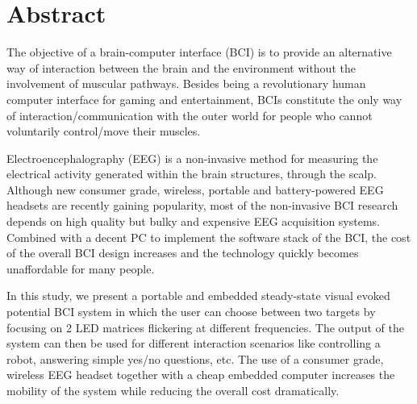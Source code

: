\documentclass[12pt]{article}
\numberwithin{equation}{section}
\numberwithin{figure}{section}
\numberwithin{table}{section}
\begin{document}
\renewcommand\listfigurename{\normalsize\bfseries List of Figures}
\thispagestyle{empty}
\vspace*{0.15cm}
\listoffigures
\clearpage

\renewcommand\listtablename{\normalsize\bfseries List of Tables}
\thispagestyle{empty}
\vspace*{0.15cm}
\listoftables
\clearpage

\vspace*{-0.35cm}
\thispagestyle{empty}
\section*{Abstract}
\vspace*{6pt}

\par{
    The objective of a brain-computer interface (BCI) is to provide an alternative way of interaction between the brain and the environment
    without the involvement of muscular pathways. Besides being a revolutionary human computer interface for gaming and entertainment,
    BCIs constitute the only way of interaction/communication with the outer world for people who cannot voluntarily control/move their muscles.
}
\par{
    Electroencephalography (EEG) is a non-invasive method for measuring the electrical activity generated within the brain structures, through the scalp.
    Although new consumer grade, wireless, portable and battery-powered EEG headsets are recently gaining popularity,
    most of the non-invasive BCI research depends on high quality but bulky and expensive EEG acquisition systems.
    Combined with a decent PC to implement the software stack of the BCI, the cost of the overall
    BCI design increases and the technology quickly becomes unaffordable for many people.
}
\par{
    In this study, we present a portable and embedded steady-state visual evoked potential BCI
    system in which the user can choose between two targets by focusing on 2 LED matrices flickering
    at different frequencies. The output of the system can then be used for different
    interaction scenarios like controlling a robot, answering simple yes/no questions, etc.
    The use of a consumer grade, wireless EEG headset together with a cheap embedded computer
    increases the mobility of the system while reducing the overall cost dramatically.
}
\end{document}
